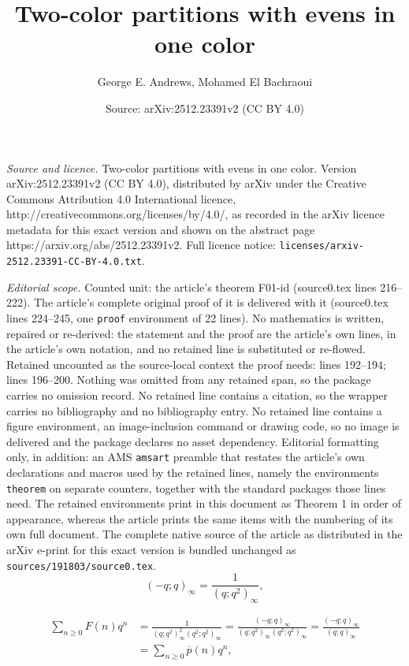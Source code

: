 \documentclass[10pt,a4paper]{amsart}
\title{Two-color partitions with evens in one color}
\author{George E. Andrews, Mohamed El Bachraoui}
\date{Source: arXiv:2512.23391v2 (CC BY 4.0)}
\newcommand{\fr}{\frac}
\begin{document}
\maketitle

\noindent\emph{Source and licence.} Two-color partitions with evens in one color. Version arXiv:2512.23391v2 (CC BY 4.0), distributed by arXiv under the Creative Commons Attribution 4.0 International licence, http://creativecommons.org/licenses/by/4.0/, as recorded in the arXiv licence metadata for this exact version and shown on the abstract page https://arxiv.org/abs/2512.23391v2. Full licence notice: \texttt{licenses/arxiv-2512.23391-CC-BY-4.0.txt}.\par\smallskip

\noindent\textit{Editorial scope.} Counted unit: the article's theorem F01-id (source0.tex lines 216--222). The article's complete original proof of it is delivered with it (source0.tex lines 224--245, one \texttt{proof} environment of 22 lines). No mathematics is written, repaired or re-derived: the statement and the proof are the article's own lines, in the article's own notation, and no retained line is substituted or re-flowed.  Retained uncounted as the source-local context the proof needs: lines 192--194; lines 196--200.  Nothing was omitted from any retained span, so the package carries no omission record.  No retained line contains a citation, so the wrapper carries no bibliography and no bibliography entry.  No retained line contains a figure environment, an image-inclusion command or drawing code, so no image is delivered and the package declares no asset dependency.  Editorial formatting only, in addition: an AMS \texttt{amsart} preamble that restates the article's own declarations and macros used by the retained lines, namely the environments \texttt{theorem} on separate counters, together with the standard packages those lines need.  The retained environments print in this document as Theorem 1 in order of appearance, whereas the article prints the same items with the numbering of its own full document.  The complete native source of the article as distributed in the arXiv e-print for this exact version is bundled unchanged as \texttt{sources/191803/source0.tex}.
\begin{equation}\label{Euler}
(-q;q)_\infty =\fr{1}{(q;q^2)_\infty},
\end{equation}

\begin{align}
\sum_{n\geq 0} F(n) q^n &=\fr{1}{(q;q^2)_\infty^2 (q^2;q^2)_\infty} =\fr{(-q;q)_\infty}{(q;q^2)_\infty (q^2;q^2)_\infty}
= \fr{(-q;q)_\infty}{(q;q)_\infty} \nonumber \\
&=\sum_{n\geq 0}\overline{p}(n) q^n, \label{F-id}
\end{align}
\end{document}
